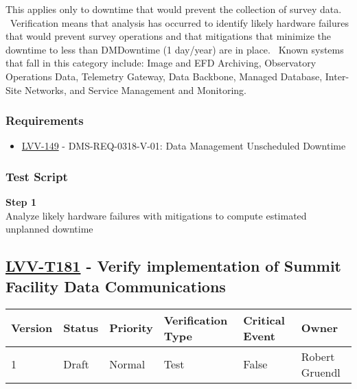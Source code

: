 This applies only to downtime that would prevent the collection of
survey data. ~Verification means that analysis has occurred to identify
likely hardware failures that would prevent survey operations and that
mitigations that minimize the downtime to less than DMDowntime (1
day/year) are in place. ~Known systems that fall in this category
include: Image and EFD Archiving, Observatory Operations Data, Telemetry
Gateway, Data Backbone, Managed Database, Inter-Site Networks, and
Service Management and Monitoring.~

\subsubsection{Requirements}\label{requirements-39}

\begin{itemize}
\tightlist
\item
  \href{https://jira.lsstcorp.org/browse/LVV-149}{LVV-149} -
  DMS-REQ-0318-V-01: Data Management Unscheduled Downtime
\end{itemize}

\subsubsection{Test Script}\label{test-script-39}

\textbf{Step 1}\\
Analyze likely hardware failures with mitigations to compute estimated
unplanned downtime\\[2\baselineskip]

\hypertarget{lvv-t181---verify-implementation-of-summit-facility-data-communications}{\subsection{\texorpdfstring{\href{https://jira.lsstcorp.org/secure/Tests.jspa\#/testCase/LVV-T181}{LVV-T181}
- Verify implementation of Summit Facility Data
Communications}{LVV-T181 - Verify implementation of Summit Facility Data Communications}}\label{lvv-t181---verify-implementation-of-summit-facility-data-communications}}

\begin{longtable}[]{@{}llllll@{}}
\toprule
Version & Status & Priority & Verification Type & Critical Event &
Owner\tabularnewline
\midrule
\endhead
1 & Draft & Normal & Test & False & Robert Gruendl\tabularnewline
\bottomrule
\end{longtable}

